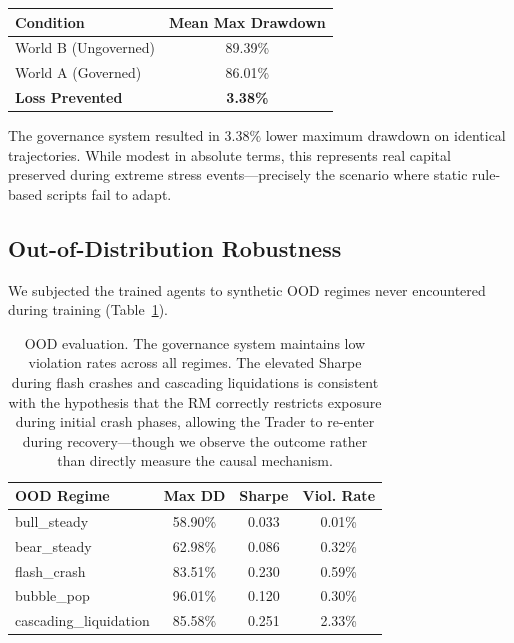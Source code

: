 \documentclass[11pt]{article}
\begin{document}
\begin{center}
\begin{tabular}{lc}
\toprule
\textbf{Condition} & \textbf{Mean Max Drawdown} \\ \midrule
World B (Ungoverned) & 89.39\% \\
World A (Governed) & 86.01\% \\
\textbf{Loss Prevented} & \textbf{3.38\%} \\ \bottomrule
\end{tabular}
\end{center}

The governance system resulted in $3.38\%$ lower maximum drawdown on identical trajectories. While modest in absolute terms, this represents real capital preserved during extreme stress events---precisely the scenario where static rule-based scripts fail to adapt.

\subsection{Out-of-Distribution Robustness}
We subjected the trained agents to synthetic OOD regimes never encountered during training (Table~\ref{tab:ood}).

\begin{table}[h]
\centering
\begin{tabular}{@{}lccc@{}}
\toprule
\textbf{OOD Regime} & \textbf{Max DD} & \textbf{Sharpe} & \textbf{Viol. Rate} \\ \midrule
bull\_steady             & 58.90\% & 0.033 & 0.01\% \\
bear\_steady             & 62.98\% & 0.086 & 0.32\% \\
flash\_crash             & 83.51\% & 0.230 & 0.59\% \\
bubble\_pop              & 96.01\% & 0.120 & 0.30\% \\
cascading\_liquidation   & 85.58\% & 0.251 & 2.33\% \\ \bottomrule
\end{tabular}
\caption{OOD evaluation. The governance system maintains low violation rates across all regimes. The elevated Sharpe during flash crashes and cascading liquidations is consistent with the hypothesis that the RM correctly restricts exposure during initial crash phases, allowing the Trader to re-enter during recovery---though we observe the outcome rather than directly measure the causal mechanism.}
\label{tab:ood}
\end{table}
\end{document}
